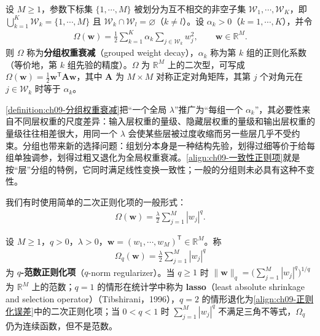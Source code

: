 \documentclass[../../main.tex]{subfiles}
\begin{document}
\begin{definition}[分组权重衰减]\label{definition:ch09-分组权重衰减}
设 $M\geqslant1$，参数下标集 $\{1,\cdots,M\}$ 被划分为互不相交的非空子集 $\mathcal{W}_{1},\cdots,\mathcal{W}_{K}$，即 $\bigcup_{k=1}^{K}\mathcal{W}_{k}=\{1,\cdots,M\}$ 且 $\mathcal{W}_{k}\cap\mathcal{W}_{l}=\varnothing$（$k\neq l$）。设 $\alpha_{k}>0$（$k=1,\cdots,K$），并令
\begin{align*}
\Omega(\boldsymbol{w})=\frac{1}{2}\sum_{k=1}^{K}\alpha_{k}\sum_{j\in\mathcal{W}_{k}}w_{j}^{2},\qquad \boldsymbol{w}\in\mathbb{R}^{M}.
\end{align*}
则 $\Omega$ 称为\textbf{分组权重衰减}（grouped weight decay），$\alpha_{k}$ 称为第 $k$ 组的正则化系数（等价地，第 $k$ 组先验的精度）。$\Omega$ 为 $\mathbb{R}^{M}$ 上的二次型，可写成 $\Omega(\boldsymbol{w})=\frac{1}{2}\boldsymbol{w}^{\mathsf T}\boldsymbol{A}\boldsymbol{w}$，其中 $\boldsymbol{A}$ 为 $M\times M$ 对称正定对角矩阵，其第 $j$ 个对角元在 $j\in\mathcal{W}_{k}$ 时等于 $\alpha_{k}$。
\end{definition}

\begin{remark}\cref{definition:ch09-分组权重衰减}把“一个全局 $\lambda$”推广为“每组一个 $\alpha_{k}$”，其必要性来自不同层权重的尺度差异：输入层权重的量级、隐藏层权重的量级和输出层权重的量级往往相差很大，用同一个 $\lambda$ 会使某些层被过度收缩而另一些层几乎不受约束。分组也带来新的选择问题：组划分本身是一种结构先验，划得过细等价于给每组单独调参，划得过粗又退化为全局权重衰减。\eqref{align:ch09-一致性正则项}就是按“层”分组的特例，它同时满足线性变换一致性；一般的分组则未必具有这种不变性。
\end{remark}

我们有时使用简单的二次正则化项的一般形式：
\begin{align}
\Omega(\boldsymbol{w})=\frac{\lambda}{2}\sum_{j=1}^{M}|w_{j}|^{q}.
\label{align:ch09-q范数正则}
\end{align}

\begin{definition}\label{definition:ch09-lasso}
设 $M\geqslant1$，$q>0$，$\lambda>0$，$\boldsymbol{w}=(w_{1},\cdots,w_{M})^{\mathsf T}\in\mathbb{R}^{M}$。称
\begin{align*}
\Omega_{q}(\boldsymbol{w})=\frac{\lambda}{2}\sum_{j=1}^{M}|w_{j}|^{q}
\end{align*}
为 \textbf{$q$-范数正则化项}（$q$-norm regularizer）。当 $q\geqslant1$ 时 $\|\boldsymbol{w}\|_{q}=\bigl(\sum_{j=1}^{M}|w_{j}|^{q}\bigr)^{1/q}$ 为 $\mathbb{R}^{M}$ 上的范数；$q=1$ 的情形在统计学中称为 \textbf{lasso}（least absolute shrinkage and selection operator）（Tibshirani，1996），$q=2$ 的情形退化为\eqref{align:ch09-正则化误差}中的二次正则化项；当 $0<q<1$ 时 $\sum_{j=1}^{M}|w_{j}|^{q}$ 不满足三角不等式，$\Omega_{q}$ 仍为连续函数，但不是范数。
\end{definition}
\end{document}
